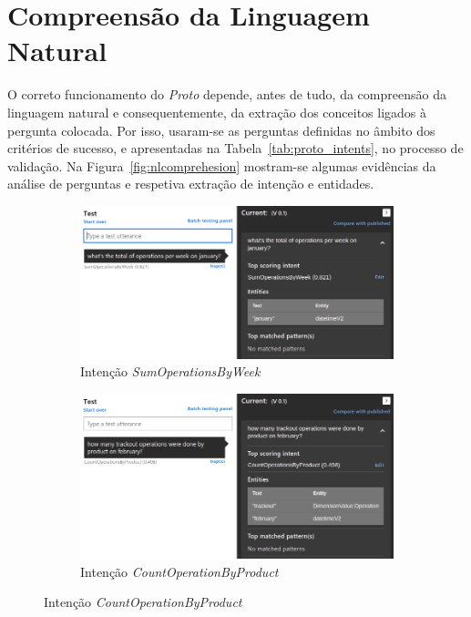 \section{Compreensão da Linguagem Natural}
\label{sec:chap06_comprehension}
O correto funcionamento do \textit{Proto} depende, antes de tudo, da compreensão da linguagem natural e consequentemente, da extração dos conceitos ligados à pergunta colocada. Por isso, usaram-se as perguntas definidas no âmbito dos critérios de sucesso, e apresentadas na Tabela~\ref{tab:proto_intents}, no processo de validação. Na Figura~\ref{fig:nlcomprehesion} mostram-se algumas evidências da análise de perguntas e respetiva extração de intenção e entidades.
%
\begin{figure}
\centering
    \begin{subfigure}[t]{.48\textwidth}
        \centering
        \includegraphics[width=\textwidth]{ch06/assets/nlcomprehension01.png}
        \caption{Intenção \textit{SumOperationsByWeek}}
     \end{subfigure}
     \begin{subfigure}[t]{.48\textwidth}
         \centering
        \includegraphics[width=\textwidth]{ch06/assets/nlcomprehension02.png}
        \caption{Intenção \textit{CountOperationByProduct}}

\end{subfigure}
\end{figure}
